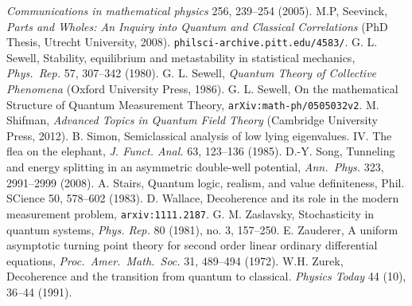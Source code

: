 \documentclass[12pt]{article}
\begin{document}
\begin{thebibliography}{99}
\begin{footnotesize}
\emph{Communications in mathematical physics} 256, 239--254 (2005).
 M.P, Seevinck, \emph{Parts and Wholes: An Inquiry into Quantum and Classical Correlations} (PhD Thesis, Utrecht University, 2008). \texttt{philsci-archive.pitt.edu/4583/}.
 G. L.  Sewell, Stability, equilibrium and metastability in statistical mechanics,
\emph{Phys.\ Rep.} 57, 307--342 (1980). 
 G. L.  Sewell, \emph{Quantum Theory of Collective Phenomena} (Oxford University Press, 1986).
 G. L.  Sewell, On the mathematical Structure of Quantum Measurement Theory, 
\texttt{arXiv:math-ph/0505032v2}.
 M. Shifman, \emph{Advanced Topics in Quantum Field Theory} (Cambridge University Press, 2012).
  B. Simon, Semiclassical analysis of low lying eigenvalues. IV. The flea on the elephant,  \emph{J. Funct. Anal.} 63, 123--136 (1985).
 D.-Y. Song, Tunneling and energy splitting in an asymmetric double-well potential,
\emph{Ann.\ Phys.} 323, 2991--2999 (2008).
 A. Stairs, Quantum logic, realism, and value definiteness, Phil. SCience  50, 578--602 (1983).
 D. Wallace, Decoherence and its role in the modern
measurement problem, \texttt{arxiv:1111.2187}.
 G. M. Zaslavsky, Stochasticity in quantum systems, \emph{Phys. Rep.}  80 (1981), no. 3, 157--250.
 E. Zauderer, A uniform asymptotic turning point theory for second order linear ordinary differential equations, \emph{Proc.\ Amer.\ Math.\ Soc.} 31, 489--494 (1972). 
  W.H. Zurek,  Decoherence and the transition from quantum to classical. {\it Physics Today} 44 (10), 36--44 (1991).
\end{footnotesize}
\end{thebibliography}
\end{document}
